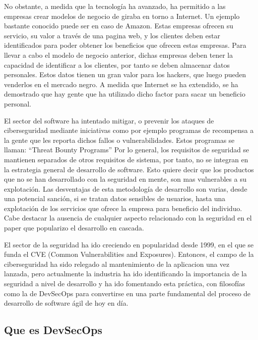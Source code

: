 \documentclass[12pt]{report} %
\begin{document}
No obstante, a medida que la tecnología ha avanzado, ha permitido a las empresas crear modelos de negocio de giraba en torno a Internet.
Un ejemplo bastante conocido puede ser en caso de Amazon.
Estas empresas ofrecen su servicio, su valor a través de una pagina web, y los clientes deben estar identificados para poder obtener los beneficios que ofrecen estas empresas.
Para llevar a cabo el modelo de negocio anterior, dichas empresas deben tener la capacidad de identificar a los clientes, por tanto se deben almacenar datos personales.
Estos datos tienen un gran valor para los hackers, que luego pueden venderlos en el mercado negro.
A medida que Internet se ha extendido, se ha demostrado que hay gente que ha utilizado dicho factor para sacar un beneficio personal.

El sector del software ha intentado mitigar, o prevenir los ataques de ciberseguridad mediante iniciativas como por ejemplo programas de recompensa a la gente que les reporta dichos fallos o vulnerabilidades.
Estos programas se llaman: ``Threat Bounty Programs''
Por lo general, los requisitos de seguridad se mantienen separados de otros requisitos de sistema, por tanto, no se integran en la estrategia general de desarrollo de software. \cite{Flec2003}
Esto quiere decir que los productos que no se han desarrollado con la seguridad en mente, son mas vulnerables a su explotación.
Las desventajas de esta metodología de desarrollo son varias, desde una potencial sanción, si se tratan datos sensibles de usuarios, hasta una explotación de los servicios que ofrece la empresa para beneficio del individuo.
Cabe destacar la ausencia de cualquier aspecto relacionado con la seguridad en el paper que popularizo el desarrollo en cascada. \cite{royce1970}

El sector de la seguridad ha ido creciendo en popularidad desde 1999, en el que se funda el CVE (Common Vulnerabilities and Exposures). 
Entonces, el campo de la ciberseguridad ha sido relegado al mantenimiento de la aplicacion una vez lanzada, pero actualmente la industria ha ido identificando la importancia de la seguridad a nivel de desarrollo y ha ido fomentando esta práctica, con filosofías como la de DevSecOps para convertirse en una parte fundamental del proceso de desarrollo de software ágil de hoy en día.

\subsection{Que es DevSecOps}
\end{document}

